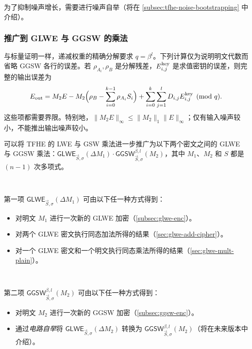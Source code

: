 为了抑制噪声增长，需要进行噪声自举（将在 \autoref{subsec:tfhe-noise-bootstrapping} 中介绍）。

\subsubsection{推广到 GLWE 与 GGSW 的乘法}
\label{subsubsec:tfhe-glwe-to-ggsw-multiplication}

与标量证明一样，递减权重的精确分解要求 $q=\beta^l$。下列计算仅为说明明文代数而省略 GGSW 各行的误差。若 $\rho_{A_i},\rho_B$ 是分解残差，$E_{i,j}^{\rm key}$ 是求值密钥的误差，则完整的输出误差为
\[
E_{\rm out}=M_2E-M_2\Bigl(\rho_B-\sum_{i=0}^{k-1}\rho_{A_i}S_i\Bigr)+\sum_{i=0}^{k}\sum_{j=1}^{l}D_{i,j}E_{i,j}^{\rm key}\pmod q.
\]
这些项都需要界限。特别地，$\|M_2E\|_\infty\leq\|M_2\|_1\|E\|_\infty$；仅有输入噪声较小，不能推出输出噪声较小。

可以将 TFHE 的 LWE 与 GSW 乘法进一步推广为以下两个密文之间的 GLWE 与 GGSW 乘法：$\textsf{GLWE}_{\vec{S}, \sigma}(\Delta M_1) \cdot \textsf{GGSW}_{\vec{S}, \sigma}^{\beta, l}(M_2)$，其中 $M_1$、$M_2$ 和 $S$ 都是 $(n-1)$ 次多项式。


$ $

\noindent 第一项 $\textsf{GLWE}_{\vec{S}, \sigma}(\Delta M_1)$ 可由以下任一种方式得到：
\begin{itemize}
\item 对明文 $M_1$ 进行一次新的 GLWE 加密（\autoref{subsec:glwe-enc}）。
\item 对两个 GLWE 密文执行同态加法所得的结果（\autoref{sec:glwe-add-cipher}）。
\item 对一个 GLWE 密文和一个明文执行同态乘法所得的结果（\autoref{sec:glwe-mult-plain}）。
\end{itemize}

$ $

\noindent 第二项 $\textsf{GGSW}_{\vec{S}, \sigma}^{\beta, l}(M_2)$ 可由以下任一种方式得到：
\begin{itemize}
\item 对明文 $M_2$ 进行一次新的 GGSW 加密（\autoref{subsec:ggsw-enc}）。
\item 通过\textit{电路自举}将 $\textsf{GLWE}_{\vec{S}, \sigma}(\Delta M_2)$ 转换为 $\textsf{GGSW}_{\vec{S}, \sigma}^{\beta, l}(M_2)$（将在未来版本中介绍）。
\end{itemize}

$ $

